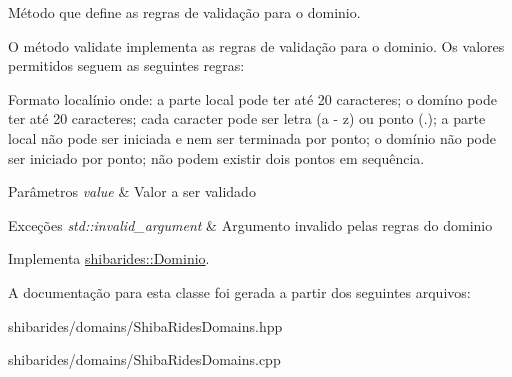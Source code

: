 Método que define as regras de validação para o dominio. 

O método validate implementa as regras de validação para o dominio. Os valores permitidos seguem as seguintes regras\+:

Formato localínio onde\+: a parte local pode ter até 20 caracteres; o domíno pode ter até 20 caracteres; cada caracter pode ser letra (a -\/ z) ou ponto (.); a parte local não pode ser iniciada e nem ser terminada por ponto; o domínio não pode ser iniciado por ponto; não podem existir dois pontos em sequência.


\begin{DoxyParams}{Parâmetros}
{\em value} & Valor a ser validado \\
\hline
\end{DoxyParams}

\begin{DoxyExceptions}{Exceções}
{\em std\+::invalid\+\_\+argument} & Argumento invalido pelas regras do dominio \\
\hline
\end{DoxyExceptions}


Implementa \hyperlink{classshibarides_1_1Dominio_acc9445531455c072bbf708709aebbe55}{shibarides\+::\+Dominio}.



A documentação para esta classe foi gerada a partir dos seguintes arquivos\+:\begin{DoxyCompactItemize}
\item 
shibarides/domains/Shiba\+Rides\+Domains.\+hpp\item 
shibarides/domains/Shiba\+Rides\+Domains.\+cpp\end{DoxyCompactItemize}

